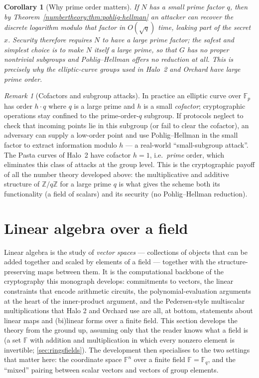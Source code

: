 \documentclass[11pt,a4paper]{article}
\newtheorem{corollary}[theorem]{Corollary}
\theoremstyle{definition}
\theoremstyle{remark}
\newtheorem{remark}[theorem]{Remark}
\newcommand{\Z}{\ensuremath{\mathbb{Z}}}
\newcommand{\F}{\ensuremath{\mathbb{F}}}
\newcommand{\Fp}{\ensuremath{\mathbb{F}_{p}}}
\newcommand{\Fq}{\ensuremath{\mathbb{F}_{q}}}
\begin{document}
\begin{corollary}[Why prime order matters]\label{numbertheory:cor:prime-order}
If \(N\) has a small prime factor \(q\), then by Theorem~\ref{numbertheory:thm:pohlig-hellman} an attacker can recover the discrete logarithm modulo that factor in \(O(\sqrt q)\) time, leaking part of the secret \(x\). Security therefore requires \(N\) to have a \emph{large} prime factor; the safest and simplest choice is to make \(N\) itself a large prime, so that \(G\) has \emph{no} proper nontrivial subgroups and Pohlig--Hellman offers no reduction at all. This is precisely why the elliptic-curve groups used in Halo~2 and Orchard have large prime order.
\end{corollary}

\begin{remark}[Cofactors and subgroup attacks]\label{numbertheory:rem:cofactor}
In practice an elliptic curve over \(\Fp\) has order \(h \cdot q\) where \(q\) is a large prime and \(h\) is a small \emph{cofactor}; cryptographic operations stay confined to the prime-order-\(q\) subgroup. If protocols neglect to check that incoming points lie in this subgroup (or fail to clear the cofactor), an adversary can supply a low-order point and use Pohlig--Hellman in the small factor to extract information modulo \(h\) --- a real-world ``small-subgroup attack''. The Pasta curves of Halo~2 have cofactor \(h = 1\), i.e.\ \emph{prime} order, which eliminates this class of attacks at the group level. This is the cryptographic payoff of all the number theory developed above: the multiplicative and additive structure of \(\Z/q\Z\) for a large prime \(q\) is what gives the scheme both its functionality (a field of scalars) and its security (no Pohlig--Hellman reduction).
\end{remark}

\clearpage

\section{Linear algebra over a field}\label{sec:linalg}

Linear algebra is the study of \emph{vector spaces} — collections of objects that can be added together and scaled by elements of a field — together with the structure-preserving maps between them. It is the computational backbone of the cryptography this monograph develops: commitments to vectors, the linear constraints that encode arithmetic circuits, the polynomial-evaluation arguments at the heart of the inner-product argument, and the Pedersen-style multiscalar multiplications that Halo 2 and Orchard use are all, at bottom, statements about linear maps and (bi)linear forms over a finite field. This section develops the theory from the ground up, assuming only that the reader knows what a field is (a set \(\F\) with addition and multiplication in which every nonzero element is invertible; \cref{sec:ringsfields}). The development then specialises to the two settings that matter here: the coordinate space \(\F^n\) over a finite field \(\F = \Fq\), and the ``mixed'' pairing between scalar vectors and vectors of group elements.
\end{document}
